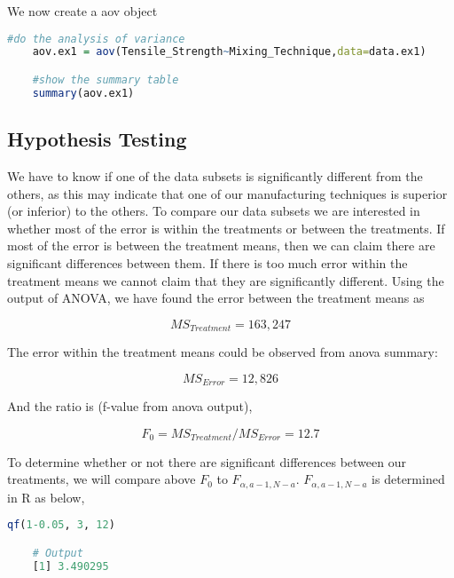 \documentclass[11pt]{article}
\begin{document}
\clearpage



We now create a aov object

\begin{lstlisting}[language=R]
    #do the analysis of variance
    aov.ex1 = aov(Tensile_Strength~Mixing_Technique,data=data.ex1)

    #show the summary table
    summary(aov.ex1)
\end{lstlisting}



\subsection{Hypothesis Testing}
We have to know if one of the data subsets is significantly different from the others, as this may indicate that one of our manufacturing techniques is superior (or inferior) to the others. To compare our data subsets we are interested in whether most of the error is within the treatments or between the treatments. If most of the error is between the treatment means, then we can claim there are significant differences between them. If there is too much error within the treatment means we cannot claim that they are significantly different. Using the output of ANOVA, we have found the error between the treatment means as 

$$\displaystyle MS_{Treatment} = 163,247$$

The error within the treatment means could be observed from anova summary: 

$$\displaystyle MS_{Error} = 12,826$$

And the ratio is (f-value from anova output),

$$\displaystyle F_0 = MS_{Treatment}/MS_{Error} = 12.7$$

To determine whether or not there are significant differences between our treatments, we will compare above $\displaystyle F_0$ to $\displaystyle F_{\alpha, a-1, N-a}$. $\displaystyle F_{\alpha, a-1, N-a}$ is determined in R as below,

\begin{lstlisting}[language=R]
    qf(1-0.05, 3, 12)   

    # Output
    [1] 3.490295
\end{lstlisting}
\end{document}
